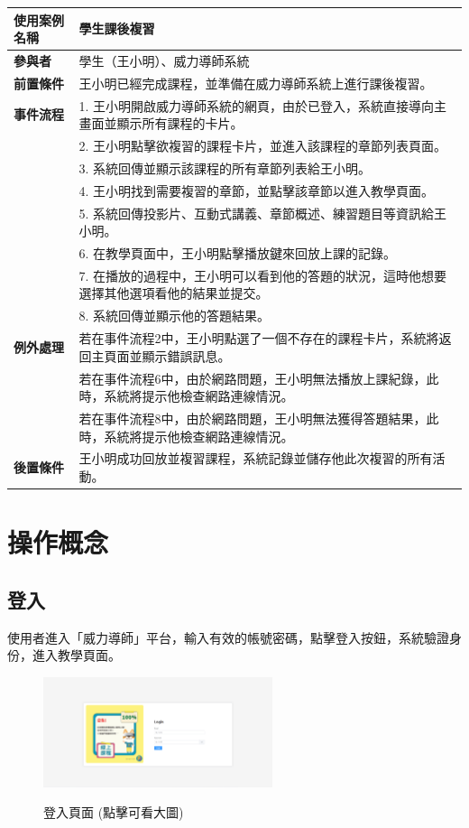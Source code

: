 \documentclass[12pt]{article}
\begin{document}
\begin{longtable}{|l|p{14cm}|}
  \hline
  \textbf{使用案例名稱} & 學生課後複習 \\ 
  \hline
  \textbf{參與者} & 學生（王小明）、威力導師系統 \\ 
  \hline
  \textbf{前置條件} & 王小明已經完成課程，並準備在威力導師系統上進行課後複習。 \\ 
  \hline
  \textbf{事件流程} 
  & 1. 王小明開啟威力導師系統的網頁，由於已登入，系統直接導向主畫面並顯示所有課程的卡片。 \\
  & 2. 王小明點擊欲複習的課程卡片，並進入該課程的章節列表頁面。 \\
  & 3. 系統回傳並顯示該課程的所有章節列表給王小明。 \\
  & 4. 王小明找到需要複習的章節，並點擊該章節以進入教學頁面。 \\
  & 5. 系統回傳投影片、互動式講義、章節概述、練習題目等資訊給王小明。 \\
  & 6. 在教學頁面中，王小明點擊播放鍵來回放上課的記錄。 \\
  & 7. 在播放的過程中，王小明可以看到他的答題的狀況，這時他想要選擇其他選項看他的結果並提交。 \\
  & 8. 系統回傳並顯示他的答題結果。 \\
  \hline
  \textbf{例外處理} 
  & 若在事件流程2中，王小明點選了一個不存在的課程卡片，系統將返回主頁面並顯示錯誤訊息。 \\
  & 若在事件流程6中，由於網路問題，王小明無法播放上課紀錄，此時，系統將提示他檢查網路連線情況。 \\
  & 若在事件流程8中，由於網路問題，王小明無法獲得答題結果，此時，系統將提示他檢查網路連線情況。 \\
  \hline
  \textbf{後置條件} 
  & 王小明成功回放並複習課程，系統記錄並儲存他此次複習的所有活動。 \\
  \hline
\end{longtable}

\newpage
\section{操作概念}

\subsection{登入}

使用者進入「威力導師」平台，輸入有效的帳號密碼，點擊登入按鈕，系統驗證身份，進入教學頁面。

\begin{figure}[H]
  \centering
  \href{https://raw.githubusercontent.com/programingtw/proglearn-plan/main/2023全國大專校院智慧創新暨跨域整合創作競賽/img/login.png}{
    \includegraphics[width=0.60\textwidth]{./img/login.png}
  }
  \caption{登入頁面 (點擊可看大圖)}
\end{figure}
\end{document}
